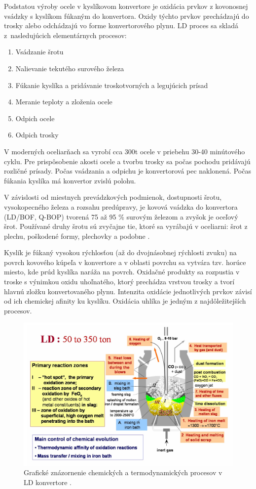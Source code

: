\documentclass[]{tukediphc}
\begin{document}
Podstatou výroby ocele v kyslíkovom konvertore je oxidácia prvkov z kovonosnej vsádzky s kyslíkom fúkaným do konvertora. Oxidy týchto prvkov prechádzajú do trosky alebo odchádzajú vo forme konvertorového plynu. LD proces sa skladá z~nasledujúcich elementárnych procesov:

\begin{enumerate}
	\item Vsádzanie šrotu
	\item Nalievanie tekutého surového železa
	\item Fúkanie kyslíka a pridávanie troskotvorných a legujúcich prísad
	\item Meranie teploty a zloženia ocele
	\item Odpich ocele
	\item Odpich trosky
\end{enumerate}

V moderných oceliarňach sa vyrobí cca 300t ocele v priebehu 30-40 minútového cyklu. Pre prispôsobenie akosti ocele a tvorbu trosky sa počas pochodu pridávajú rozličné prísady. Počas vsádzania a odpichu je konvertorová pec naklonená. Počas fúkania kyslíka má konvertor zvislú polohu.

V závislosti od miestnych prevádzkových podmienok, dostupnosti šrotu, vysokopecného železa a rozsahu predúpravy, je kovová vsádzka do konvertora (LD/BOF, Q-BOP) tvorená 75 až 95 \% surovým železom a zvyšok je oceľový šrot. Používané druhy šrotu sú zvyčajne tie, ktoré sa vyrábajú v oceliarni: šrot z plechu, poškodené formy, plechovky a podobne \cite{Turkdogan1996}.

Kyslík je fúkaný vysokou rýchlosťou (až do dvojnásobnej rýchlosti zvuku) na povrch kovového kúpeľa v konvertore a v oblasti povrchu sa vytvára tzv. horúce miesto, kde prúd kyslíka naráža na povrch. Oxidačné produkty sa rozpustia v troske s výnimkou oxidu uhoľnatého, ktorý prechádza vrstvou trosky a tvorí hlavnú zložku konvertovaného plynu. Intenzita oxidácie jednotlivých prvkov závisí od ich chemickej afinity ku kyslíku. Oxidácia uhlíka je jedným z najdôležitejších procesov.

\begin{figure}[h!]
	\centering
	\includegraphics[width=1\textwidth,angle=0]{figures/ld-convertor-processes-graphical.jpg}
	\caption{Grafické znázornenie chemických a termodynamických procesov v LD konvertore \citep{Jalkanen2006}.}
\end{figure}
\end{document}
